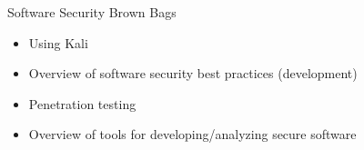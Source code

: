 \documentclass{beamer}
\begin{document}
\begin{frame}{
	\begin{minipage}[t]{0.75\textwidth}
		Software Security  Brown Bags
	\end{minipage}
	\hfill
	\begin{minipage}[t]{0.25\textwidth}
		\flushright
	\end{minipage}
}{}
	\begin{itemize}
		\item Using Kali
		\item Overview of software security best practices (development) 
		\item Penetration testing
		\item Overview of tools for developing/analyzing secure software
	\end{itemize}

\end{frame}
\end{document}
